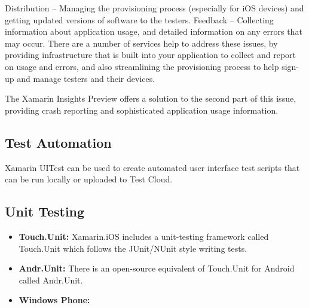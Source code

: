 Distribution – Managing the provisioning process (especially for iOS devices) and getting updated versions of software to the testers.
Feedback – Collecting information about application usage, and detailed information on any errors that may occur.
There are a number of services help to address these issues, by providing infrastructure that is built into your application to collect and report on usage and errors, and also streamlining the provisioning process to help sign-up and manage testers and their devices.

The Xamarin Insights Preview offers a solution to the second part of this issue, providing crash reporting and sophisticated application usage information.


\subsection{Test Automation}
Xamarin UITest can be used to create automated user interface test scripts that can be run locally or uploaded to Test Cloud.


\subsection{Unit Testing}


\begin{itemize}

\item \textbf{ Touch.Unit:} Xamarin.iOS includes a unit-testing framework called Touch.Unit which follows the JUnit/NUnit style writing tests.

\item \textbf{ Andr.Unit:} There is an open-source equivalent of Touch.Unit for Android called Andr.Unit.

\item \textbf{Windows Phone:}


\end{itemize}
